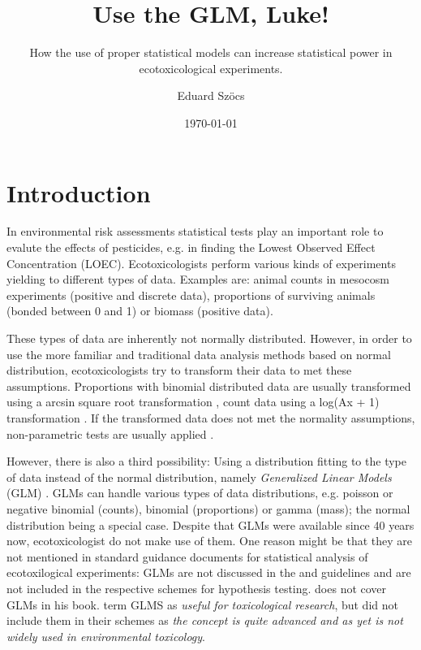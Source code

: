 \documentclass{scrartcl}\usepackage[]{graphicx}\usepackage[]{color}
\title{Use the GLM, Luke!}
\subtitle{How the use of proper statistical models can increase statistical power in ecotoxicological experiments.}
\author{Eduard Szöcs}
\date{\today}
\begin{document}
\maketitle

\section{Introduction}

In environmental risk assessments statistical tests play an important role to evalute the effects of pesticides, e.g. in finding the Lowest Observed Effect Concentration (LOEC).
Ecotoxicologists perform various kinds of experiments yielding to different types of data.
Examples are: animal counts in mesocosm experiments (positive and discrete data), 
proportions of surviving animals (bonded between 0 and 1) or biomass (positive data).

These types of data are inherently not normally distributed. 
However, in order to use the more familiar and traditional data analysis methods based on normal distribution, ecotoxicologists try to transform their data to met these assumptions. 
Proportions with binomial distributed data are usually transformed using a arcsin square root transformation \citep{oecd_current_2006,
newman_quantitative_2012},
count data using a log(Ax + 1) transformation \citep{van_den_brink_impact_2000}.
If the transformed data does not met the normality assumptions, non-parametric tests are usually applied \citep{wang_making_2011}.

However, there is also a third possibility:
Using a distribution fitting to the type of data instead of the normal distribution, namely \emph{Generalized Linear Models} (GLM) \citep{nelder_generalized_1972}. 
GLMs can handle various types of data distributions, e.g. poisson or negative binomial (counts), binomial (proportions) or gamma (mass); the normal distribution being a special case.
Despite that GLMs were available since 40 years now, ecotoxicologist do not make use of them.
One reason might be that they are not mentioned in standard guidance documents for statistical analysis of ecotoxilogical experiments:
GLMs are not discussed in the \citep{oecd_current_2006} and \citep{epa_methods_2002} guidelines and are not included in the respective schemes for hypothesis testing. 
\citet{newman_quantitative_2012} does not cover GLMs in his book.
\citet{environment_canada_guidance_2005} term GLMS as \emph{useful for toxicological research}, but did not include them in their schemes as \emph{the concept is quite advanced and as yet is not widely used in environmental toxicology}.
\end{document}
